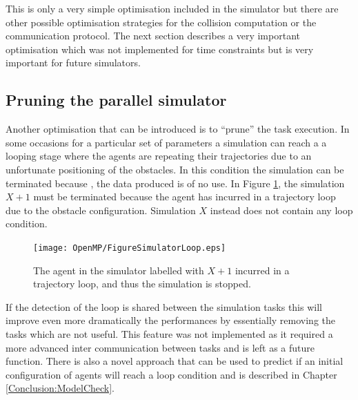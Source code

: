 This is only a very simple optimisation included in the simulator but there are
other possible optimisation strategies for the collision computation or
the communication protocol.
The next section describes a very important optimisation which was not implemented
for time constraints but is very important for future simulators.
\subsection{Pruning the parallel simulator}
Another optimisation that can be introduced is to ``prune'' the task execution.
In some occasions for a particular set of parameters a simulation can reach a
a looping stage where the agents are repeating their trajectories due to
an unfortunate positioning of the obstacles.
In this condition the simulation can be terminated because , the data produced
is of no use.
In Figure \ref{Fig:Parallel:pruneSim}, the simulation $X+1$ must be terminated
because the agent has incurred in a trajectory loop due to the obstacle configuration.
Simulation $X$ instead does not contain any loop condition.
\begin{figure}[htbp]
\begin{center}
\texttt{[image: OpenMP/FigureSimulatorLoop.eps]}
\end{center}
\small{
\caption[Pruning parallel simulations]{
The agent in the simulator labelled with $X+1$ incurred in a trajectory loop,
and thus the simulation is stopped.
\label{Fig:Parallel:pruneSim}}}
\end{figure}
If the detection of the loop is shared between the simulation tasks this will
improve even more dramatically the performances by essentially removing
the tasks which are not useful.
This feature was not implemented as it required a more advanced inter communication
between tasks and is left as a future function.
There is also a novel approach that can be used to predict if an initial
configuration of agents will reach a loop condition and is described
in Chapter \ref{Conclusion:ModelCheck}.

